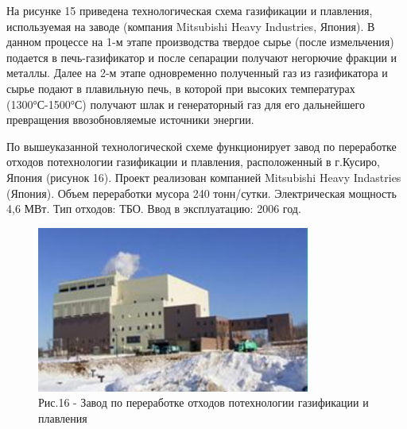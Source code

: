\begin{multicols}{2}
На рисунке 15 приведена технологическая схема газификации и плавления,
используемая на заводе (компания Mitsubishi Heavy Industries, Япония). В
данном процессе на 1-м этапе производства твердое сырье (после
измельчения) подается в печь-газификатор и после сепарации получают
негорючие фракции и металлы. Далее на 2-м этапе одновременно полученный
газ из газификатора и сырье подают в плавильную печь, в которой при
высоких температурах (1300°С-1500°С) получают шлак и генераторный газ
для его дальнейшего превращения ввозобновляемые источники энергии.

По вышеуказанной технологической схеме функционирует завод по
переработке отходов потехнологии газификации и плавления, расположенный
в г.Кусиро, Япония (рисунок 16). Проект реализован компанией Mitsubishi
Heavy Indastries (Япония). Объем переработки мусора 240 тонн/сутки.
Электрическая мощность 4,6 МВт. Тип отходов: ТБО. Ввод в эксплуатацию:
2006 год.
\end{multicols}

\begin{figure}[H]
	\centering
	\includegraphics[width=0.8\textwidth]{media/chem2/image79}
	\caption*{Рис.16 - Завод по переработке отходов потехнологии газификации и плавления}
\end{figure}

